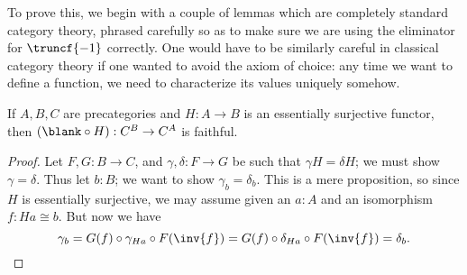 To prove this, we begin with a couple of lemmas which are completely standard category theory, phrased carefully so as to make sure we are using the eliminator for $\truncf{-1}$ correctly.
One would have to be similarly careful in classical category theory if one wanted to avoid the axiom of choice: any time we want to define a function, we need to characterize its values uniquely somehow.

\begin{lem}\label{ct:esosurj-postcomp-faithful}
  If $A,B,C$ are precategories and $H:A\to B$ is an essentially surjective functor, then $(\blank\circ H):C^B \to C^A$ is faithful.
\end{lem}
\begin{proof}
  Let $F,G:B\to C$, and $\gamma,\delta:F\to G$ be such that $\gamma H = \delta H$; we must show $\gamma=\delta$.
  Thus let $b:B$; we want to show $\gamma_b=\delta_b$.
  This is a mere proposition, so since $H$ is essentially surjective, we may assume given an $a:A$ and an isomorphism $f:Ha\cong b$.
  But now we have
  \[ \gamma_b = G(f) \circ \gamma_{Ha} \circ F(\inv{f})
  = G(f) \circ \delta_{Ha} \circ F(\inv{f})
  = \delta_b.\qedhere
  \]
\end{proof}

